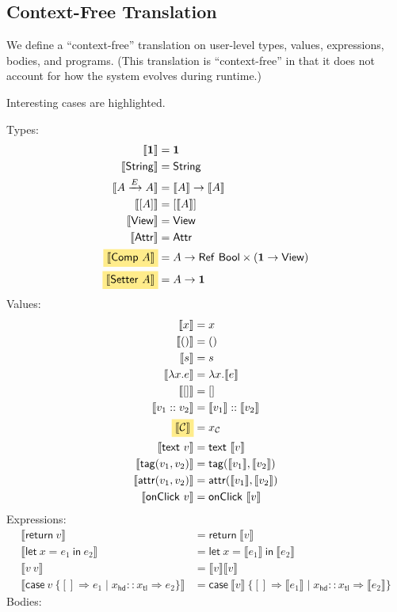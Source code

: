 \documentclass{article}
\newcommand{\mf}[1]{\mathsf{#1}}
\newcommand{\mc}[1]{\mathcal{#1}}
\newcommand{\mb}[1]{\mathbf{#1}}
\newcommand{\mhl}[1]{\colorbox{LightGoldenrod1}{$#1$}}
\newcommand{\hl}[1]{\colorbox{LightGoldenrod1}{#1}}
\newcommand{\llrr}[1]{\llbracket #1 \rrbracket}
\newcommand{\tone}{\mb{1}}
\newcommand{\tstr}{\mf{String}}
\newcommand{\tbool}{\mf{Bool}}
\newcommand{\tview}{\mf{View}}
\newcommand{\tattr}{\mf{Attr}}
\newcommand{\tcomp}[1]{\mf{Comp}\ #1}
\newcommand{\tset}[1]{\mf{Setter}\ #1}
\newcommand{\tref}[1]{\mf{Ref}\ #1}
\newcommand{\C}{\mc{C}}
\newcommand{\vtxt}[1]{\mf{text}\ #1}
\newcommand{\vtag}[2]{\mf{tag}(#1, #2)}
\newcommand{\vattr}[2]{\mf{attr}(#1, #2)}
\newcommand{\vclick}[1]{\mf{onClick}\ #1}
\newcommand{\elet}[3]{\mf{let}\ #1 = #2\ \mf{in}\ #3}
\newcommand{\eret}[1]{\mf{return}\ #1}
\newcommand{\ecase}[5]{\mf{case}\ #1\ \{#2 \Rightarrow #3 \mid #4 \Rightarrow #5\}}
\begin{document}
\subsection{Context-Free Translation}

We define a ``context-free'' translation on user-level types, values,
expressions, bodies, and programs.
(This translation is ``context-free'' in that it does not account for
how the system evolves during runtime.)

Interesting cases are \hl{highlighted}.

Types:
\begin{align*}
\llrr{\tone} &= \tone\\
\llrr{\tstr} &= \tstr\\
\llrr{A \xrightarrow{E} A} &= \llrr{A} \rightarrow \llrr{A}\\
\llrr{[A]} &= [\llrr{A}]\\
\llrr{\tview} &= \tview\\
\llrr{\tattr} &= \tattr\\
\mhl{\llrr{\tcomp{A}}} &= A \rightarrow \tref{\tbool} 
\times (\tone \rightarrow \tview)\\
\mhl{\llrr{\tset{A}}} &= A \rightarrow \tone
\end{align*}
Values:
\begin{align*}
\llrr{x} &= x\\
\llrr{()} &= ()\\
\llrr{s} &= s\\
\llrr{\lambda x.e} &= \lambda x.\llrr{e}\\
\llrr{[]} &= []\\
\llrr{v_1 :: v_2} &= \llrr{v_1} :: \llrr{v_2}\\
\mhl{\llrr{\C}} &= x_\C\\
\llrr{\vtxt{v}} &= \vtxt{\llrr{v}}\\
\llrr{\vtag{v_1}{v_2}} &= \vtag{\llrr{v_1}}{\llrr{v_2}}\\
\llrr{\vattr{v_1}{v_2}} &= \vattr{\llrr{v_1}}{\llrr{v_2}}\\
\llrr{\vclick{v}} &= \vclick{\llrr{v}}
\end{align*}
Expressions:
\begin{align*}
\llrr{\eret{v}} &= \eret{\llrr{v}}\\
\llrr{\elet{x}{e_1}{e_2}} &= \elet{x}{\llrr{e_1}}{\llrr{e_2}}\\
\llrr{v\ v} &= \llrr{v}\llrr{v}\\
\llrr{\ecase{v}{[]}{e_1}{x_\mf{hd} :: x_\mf{tl}}{e_2}}
&= \ecase{\llrr{v}}{[]}{\llrr{e_1}}{x_\mf{hd} :: x_\mf{tl}}{\llrr{e_2}}
\end{align*}
Bodies:
\end{document}
